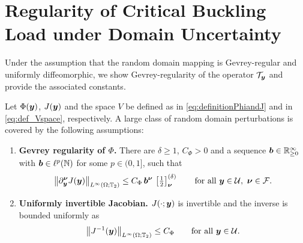 \section{Regularity of Critical Buckling Load under Domain Uncertainty} \label{sec:regularityOfTy}


Under the assumption that the random domain mapping is Gevrey-regular and uniformly diffeomorphic, we show Gevrey-regularity of the operator $\mathcal{T}_{\boldsymbol{y}}$ and provide the associated constants. 


Let $\Phi({\boldsymbol{y}})$, $J({\boldsymbol{y}})$ and the space $V$ be defined as in \eqref{eq:definitionPhiandJ} and in \eqref{eq:def_Vspace}, respectively.
A large class of random domain perturbations is covered by the following assumptions:
\begin{assumption}\label{assumption:GevreyRegularityJ}
\begin{enumerate}
  \item[\textbf{(A1)}]  \textbf{Gevrey regularity of $\Phi$.}
  There are $\delta\ge1$, $C_\Phi>0$ and a sequence ${\boldsymbol{b}}\in\mathbb{R}_{\ge0}^\infty$ with
  ${\boldsymbol{b}}\in\ell^p(\mathbb{N})$ for some $p\in(0,1]$, such that
  \begin{equation}\label{eq:PhiAssumption}  
  \big\|\partial^{{\boldsymbol{\nu}}}_{{\boldsymbol{y}}} J({\boldsymbol{y}})\big\|_{L^{\infty}(\Omega;\mathbb{T}_2)}
    \le C_\Phi\,{\boldsymbol{b}}^{{\boldsymbol{\nu}}}\,\left[\tfrac{1}{2} \right]^{(\delta)}_{{\boldsymbol{\nu}}}
    \qquad\text{for all }{\boldsymbol{y}}\in\mathcal{U},\ {\boldsymbol{\nu}}\in\mathcal F .
  \end{equation}
 \item[\textbf{(A2)}]     \textbf{Uniformly invertible Jacobian.}
  $J(\cdot;{\boldsymbol{y}})$ is invertible and the inverse is bounded uniformly as
  \begin{equation}\label{eq:Jacobian_inverseBound}
    \big\|J^{-1}({\boldsymbol{y}})\big\|_{L^\infty(\Omega;\mathbb{T}_2)}\le C_\Phi
    \qquad\text{for all }{\boldsymbol{y}}\in\mathcal{U} .
  \end{equation}
  \end{enumerate}
\end{assumption}


